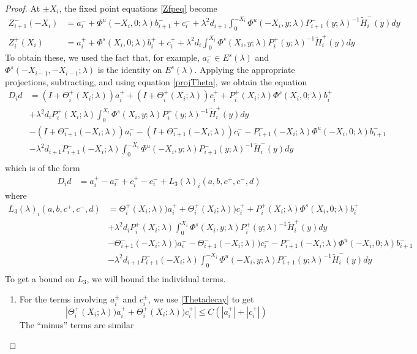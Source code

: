 \documentclass[thesis.tex]{subfiles}
\begin{document}
\begin{lemma}
\begin{proof}
At $\pm X_i$, the fixed point equations \eqref{Zfpeq} become
\begin{align*}
Z_{i+1}^-(-X_i) &= a_i^- + \Phi^u(-X_i, 0; \lambda) b_{i+1}^- + c_i^- 
+ \lambda^2 d_{i+1} \int_0^{-X_i} \Phi^u(-X_i, y; \lambda) P_{i+1}^-(y; \lambda)^{-1} \tilde{H}_i^-(y) dy \\
Z_i^+(X_i) &= a_i^+ + \Phi^s(X_i, 0; \lambda) b_i^+ + c_i^+ 
+ \lambda^2 d_i \int_0^{X_i} \Phi^s(X_i, y; \lambda) P_i^+(y; \lambda)^{-1} \tilde{H}_i^+(y) dy
\end{align*}
To obtain these, we used the fact that, for example, $a_i^- \in E^s(\lambda)$ and $\Phi^s(-X_{i-1}, -X_{i-1}; \lambda)$ is the identity on $E^s(\lambda)$. Applying the appropriate projections, subtracting, and using equation \eqref{projTheta}, we obtain the equation 
\begin{align*}
D_i d &= (I + \Theta_i^+(X_i; \lambda))a_i^+ + (I + \Theta_i^+(X_i; \lambda))c_i^+ + P_i^+(X_i; \lambda)\Phi^s(X_i, 0; \lambda) b_i^+ \\
&+ \lambda^2 d_i P_i^+(X_i; \lambda) \int_0^{X_i} \Phi^s(X_i, y; \lambda) P_i^+(y; \lambda)^{-1} \tilde{H}_i^+(y) dy \\
&- (I + \Theta_{i+1}^-(-X_i; \lambda))a_i^- - (I + \Theta_{i+1}^-(-X_i; \lambda))c_i^- - P_{i+1}^-(-X_i; \lambda)\Phi^u(-X_i, 0; \lambda) b_{i+1}^- \\ 
&- \lambda^2 d_{i+1} P_{i+1}^-(-X_i; \lambda) \int_0^{-X_i} \Phi^u(-X_i, y; \lambda) P_{i+1}^-(y; \lambda)^{-1} \tilde{H}_i^-(y) dy \\
\end{align*}
which is of the form
\begin{align}\label{Dideq1}
D_i d &= a_i^+ - a_i^- + c_i^+ - c_i^- + L_3(\lambda)_i(a, b, c^+, c^-, d)
\end{align}
where
\begin{align*}
L_3(\lambda)_i(a, b, c^+, c^-, d) &= \Theta_i^+(X_i; \lambda))a_i^+ + \Theta_i^+(X_i; \lambda))c_i^+ + P_i^+(X_i; \lambda)\Phi^s(X_i, 0; \lambda) b_i^+ \\
&+ \lambda^2 d_i P_i^+(X_i; \lambda) \int_0^{X_i} \Phi^s(X_i, y; \lambda) P_i^+(y; \lambda)^{-1} \tilde{H}_i^+(y) dy \\
&- \Theta_{i+1}^-(-X_i; \lambda))a_i^- - \Theta_{i+1}^-(-X_i; \lambda))c_i^- - P_{i+1}^-(-X_i; \lambda)\Phi^u(-X_i, 0; \lambda) b_{i+1}^- \\ &- \lambda^2 d_{i+1} P_{i+1}^-(-X_i; \lambda) \int_0^{-X_i} \Phi^u(-X_i, y; \lambda) P_{i+1}^-(y; \lambda)^{-1} \tilde{H}_i^-(y) dy \\
\end{align*}
To get a bound on $L_3$, we will bound the individual terms. 
\begin{enumerate}
\item For the terms involving $a_i^\pm$ and $c_i^\pm$, we use \eqref{Thetadecay} to get
\[
|\Theta_i^+(X_i; \lambda))a_i^+ + \Theta_i^+(X_i; \lambda))c_i^+| 
\leq C(|a_i^+| + |c_i^+|)
\]
The ``minus'' terms are similar


\end{enumerate}
\end{proof}
\end{lemma}
\end{document}

